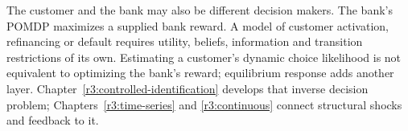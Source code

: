 The customer and the bank may also be different decision makers. The
bank's POMDP maximizes a supplied bank reward. A model of customer
activation, refinancing or default requires utility, beliefs, information
and transition restrictions of its own. Estimating a customer's dynamic
choice likelihood is not equivalent to optimizing the bank's reward;
equilibrium response adds another layer. Chapter~\ref{r3:controlled-identification}
develops that inverse decision problem; Chapters~\ref{r3:time-series}
and \ref{r3:continuous} connect structural shocks and feedback to it.
